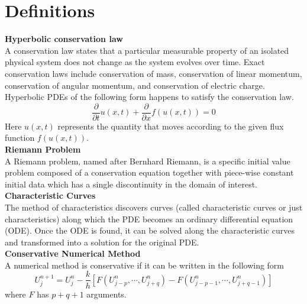 \documentclass{article}
\begin{document}
\section{Definitions}
% 
\noindent \textbf{Hyperbolic conservation law} \\
A conservation law states that a particular measurable property of an isolated physical system does not change as the system evolves over time. Exact conservation laws include conservation of mass, conservation of linear momentum, conservation of angular momentum, and conservation of electric charge. Hyperbolic PDEs of the following form happens to satisfy the conservation law.
\begin{equation}
    \frac{\partial }{\partial t}u(x,t) + \frac{\partial }{\partial x}f(u(x,t)) = 0
\end{equation}
Here $u(x,t)$ represents the quantity that moves according to the given flux function $f(u(x,t))$.\\

\noindent \textbf{Riemann Problem} \\
A Riemann problem, named after Bernhard Riemann, is a specific initial value problem composed of a conservation equation together with piece-wise constant initial data which has a single discontinuity in the domain of interest.\\

\noindent \textbf{Characteristic Curves}\\
The method of characteristics discovers curves (called characteristic curves or just characteristics) along which the PDE becomes an ordinary differential equation (ODE). Once the ODE is found, it can be solved along the characteristic curves and transformed into a solution for the original PDE.\\

\noindent \textbf{Conservative Numerical Method}\\
A numerical method is conservative if it can be written in the following form 
\begin{equation}
    U^{n+1}_{j} = U^n_j - \frac{k}{h} \left[ F(U^n_{j-p},\cdots,U^n_{j+q} ) - F(U^n_{j-p-1},\cdots,U^n_{j+q-1} )  \right]
\end{equation}
where $F$ has $p+q+1$ arguments.\\
\end{document}
